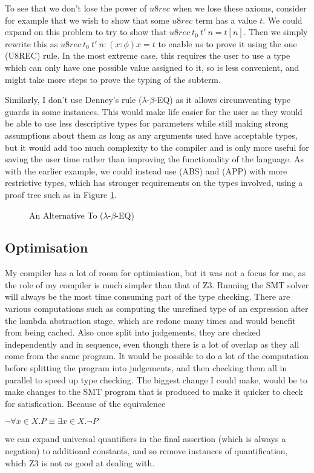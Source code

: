 To see that we don't lose the power of $u8rec$ when we lose these axioms, consider for example that
we wish to show that some $u8rec$ term has a value $t$.
We could expand on this problem to try to show that $u8rec\ t_0\ t'\ n = t[n]$.
Then we simply rewrite this as $u8rec\ t_0\ t'\ n: (x: \phi)x = t$ to enable us to prove it using
the one (U8REC) rule.
In the most extreme case, this requires the user to use a type which can only have one possible value
assigned to it, so is less convenient, and might take more steps to prove the typing of the subterm.

Similarly, I don't use Denney's rule ($\lambda$-$\beta$-EQ) as it allows circumventing type guards
in some instances.
This would make life easier for the user as they would be able to use less descriptive types for
parameters while still making strong assumptions about them as long as any arguments used have
acceptable types, but it would add too much complexity to the compiler and is only more useful
for saving the user time rather than improving the functionality of the language.
As with the earlier example, we could instead use (ABS) and (APP) with more restrictive types,
which has stronger requirements on the types involved, using a proof tree such as in Figure
\ref{fig:beta_eq}.

\begin{figure}
    \centering
    \begin{prooftree}
    \end{prooftree}
    \caption{An Alternative To ($\lambda$-$\beta$-EQ)}
    \label{fig:beta_eq}
\end{figure}

\subsection{Optimisation}

My compiler has a lot of room for optimisation, but it was not a focus for me, as the role of my
compiler is much simpler than that of Z3.
Running the SMT solver will always be the most time consuming part of the type checking.
There are various computations such as computing the unrefined type of an expression after the lambda
abstraction stage, which are redone many times and would benefit from being cached.
Also once split into judgements, they are checked independently and in sequence, even though there
is a lot of overlap as they all come from the same program.
It would be possible to do a lot of the computation before splitting the program into judgements,
and then checking them all in parallel to speed up type checking.
The biggest change I could make, would be to make changes to the SMT program that is produced to
make it quicker to check for satisfication.
Because of the equivalence

\begin{center}
    $\lnot \forall x \in X . P \equiv \exists x \in X . \lnot P$
\end{center}

we can expand universal quantifiers in the final assertion (which is always a negation) to additional
constants, and so remove instances of quantification, which Z3 is not as good at dealing with.
